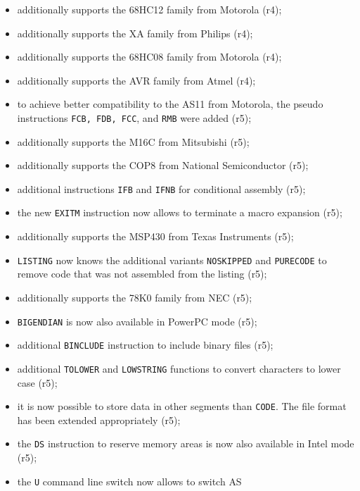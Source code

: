 \documentclass[12pt,twoside]{report}
\newcommand{\tty}[1]{{\tt #1}}
\newcommand{\asname}{{AS}}
\begin{document}
\begin{itemize}
{\begin{itemize}
{            copied to the share file (r4);}
      \item{additionally supports the 68HC12 family from Motorola
            (r4);}
      \item{additionally supports the XA family from Philips
            (r4);}
      \item{additionally supports the 68HC08 family from Motorola
            (r4);}
      \item{additionally supports the AVR family from Atmel (r4);}
      \item{to achieve better compatibility to the AS11 from
            Motorola, the pseudo instructions \tty{FCB, FDB, FCC}, and
            \tty{RMB} were added (r5);}
      \item{additionally supports the M16C from Mitsubishi (r5);}
      \item{additionally supports the COP8 from National
            Semiconductor (r5);}
      \item{additional instructions \tty{IFB} and \tty{IFNB} for conditional
            assembly (r5);}
      \item{the new \tty{EXITM} instruction now allows to terminate a
            macro expansion (r5);}
      \item{additionally supports the MSP430 from Texas
            Instruments (r5);}
      \item{\tty{LISTING} now knows the additional variants
            \tty{NOSKIPPED} and \tty{PURECODE} to remove code that
            was not assembled from the listing (r5);}
      \item{additionally supports the 78K0 family from NEC (r5);}
      \item{\tty{BIGENDIAN} is now also available in PowerPC mode
            (r5);}
      \item{additional \tty{BINCLUDE} instruction to include binary
            files (r5);}
      \item{additional \tty{TOLOWER} and \tty{LOWSTRING} functions to convert
            characters to lower case (r5);}
      \item{it is now possible to store data in other segments
            than \tty{CODE}.  The file format has been extended
            appropriately (r5);}
      \item{the \tty{DS} instruction to reserve memory areas is now
            also available in Intel mode (r5);}
      \item{the \tty{U} command line switch now allows to switch \asname{}
}
\end{itemize}}
\end{itemize}
\end{document}
